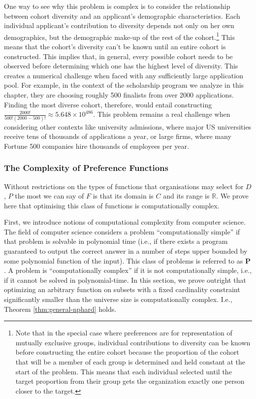 One way to see why this problem is complex is to consider the relationship between cohort diversity and an applicant's demographic characteristics. Each individual applicant's contribution to diversity depends not only on her own demographics, but the demographic make-up of the rest of the cohort.\footnote{Note that in the special case where preferences are for representation of mutually exclusive groups, individual contributions to diversity can be known before constructing the entire cohort because the proportion of the cohort that will be a member of each group is determined and held constant at the start of the problem. This means that each individual selected until the target proportion from their group gets the organization exactly one person closer to the target.} This means that the cohort's diversity can't be known until an entire cohort is constructed. This implies that, in general, every possible cohort needs to be observed before determining which one has the highest level of diversity. This creates a numerical challenge when faced with any sufficiently large application pool. For example, in the context of the scholarship program we analyze in this chapter, they are choosing roughly 500 finalists from over 2000 applications. Finding the most diverse cohort, therefore, would entail constructing $\frac{2000!}{500!(2000-500)!} \approx 5.648\times10^{486}$. This problem remains a real challenge when considering other contexts like university admissions, where major US universities receive tens of thousands of applications a year, or large firms, where many Fortune 500 companies hire thousands of employees per year.  

\subsubsection{The Complexity of Preference Functions}\label{subsubsec:proof_nphard}

Without restrictions on the types of functions that organisations may select for $D$, $P$ the most we can say of $F$ is that its domain is $C$ and its range is $\mathbb{R}$. We prove here that optimising this class of functions is computationally complex.

First, we introduce notions of computational complexity from computer science. The field of computer science considers a problem ``computationally simple'' if that problem is solvable in polynomial time (i.e., if there exists a program guaranteed to output the correct answer in a number of steps upper bounded by some polynomial function of the input). This class of problems is referred to as $\mathbf{P}$. A problem is ``computationally complex'' if it is not computationally simple, i.e., if it cannot be solved in polynomial-time. In this section, we prove outright that optimizing an arbitrary function on subsets with a fixed cardinality constraint significantly smaller than the universe size is computationally complex. I.e., Theorem \ref{thm:general-nphard} holds.


